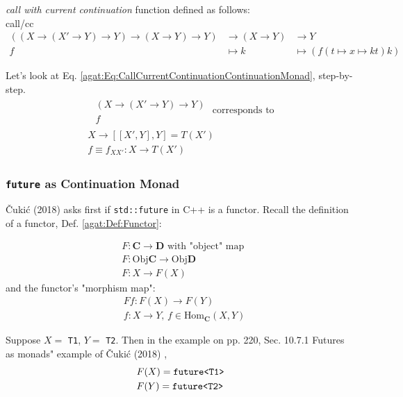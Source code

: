 \emph{call with current continuation} function defined as follows: \\
call/cc
\begin{equation}\label{agat:Eq:CallCurrentContinuationContinuationMonad}
\begin{aligned}
((X \to (X' \to Y) \to Y) \to (X\to Y) \to Y) & \to (X\to Y)  & \to Y \\ 
f & \mapsto k & \mapsto (f(t\mapsto x \mapsto kt) k) 
\end{aligned}
\end{equation}

Let's look at Eq. \ref{agat:Eq:CallCurrentContinuationContinuationMonad}, step-by-step.
\[
\begin{gathered}
\begin{aligned} 
& (X\to (X' \to Y) \to Y) \\
& f
\end{aligned} \text{ corresponds to } \\
\begin{gathered}
X \to [[X' , Y], Y] = T(X') \\
f \equiv f_{XX'} : X \to T(X')
\end{gathered}
\end{gathered}
\]

\subsubsection{\texttt{future} as Continuation Monad}

 \v{C}uki\'{c} (2018) \cite{agat:Cuki2018} asks first if \verb|std::future| in C++ is a functor. Recall the definition of a functor, Def. \ref{agat:Def:Functor}:

\[
\begin{aligned}
& F: \mathbf{C} \to \mathbf{D} \text{ with "object" map } \\ 
& F: \text{Obj}{\mathbf{C}} \to \text{Obj}{\mathbf{D}} \\ 
& F: X \to F(X)
\end{aligned}
\] 
and the functor's "morphism map":
\[
\begin{aligned}
& Ff :F(X) \to F(Y) \\ 
& f:X \to Y, \, f \in \text{Hom}_{\mathbf{C}}(X, Y)
\end{aligned}
\]

Suppose $X = $ \texttt{T1}, $Y = $ \texttt{T2}. Then in the example on pp. 220, Sec. 10.7.1 Futures as monads" example of \v{C}uki\'{c} (2018) \cite{agat:Cuki2018}, 
\[
\begin{aligned}
& F(X) = \verb|future<T1>| \\ 
& F(Y) = \verb|future<T2>|
\end{aligned}
\]

